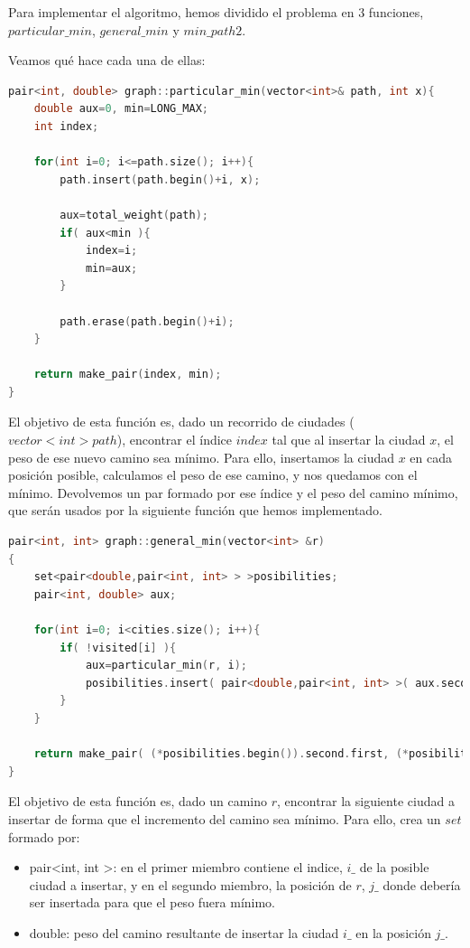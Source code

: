 \documentclass[11pt]{article}
\begin{document}
Para implementar el algoritmo, hemos dividido el problema en 3 funciones, $particular\_min$, $general\_min$ y $min\_path2$.

Veamos qué hace cada una de ellas:

\begin{lstlisting}[language=C++, caption=particular\_min]
pair<int, double> graph::particular_min(vector<int>& path, int x){
	double aux=0, min=LONG_MAX; 
	int index;
	
	for(int i=0; i<=path.size(); i++){
		path.insert(path.begin()+i, x);
		
		aux=total_weight(path);
		if( aux<min ){
			index=i;
			min=aux;
		}
		
		path.erase(path.begin()+i);
	}  

	return make_pair(index, min);
}
\end{lstlisting}

El objetivo de esta función es, dado un recorrido de ciudades ($vector<int> path$), encontrar el índice $index$ tal que al insertar la ciudad $x$, el peso de ese nuevo camino sea mínimo.
Para ello, insertamos la ciudad $x$ en cada posición posible, calculamos el peso de ese camino, y nos quedamos con el mínimo.
Devolvemos un par formado por ese índice y el peso del camino mínimo, que serán usados por la siguiente función que hemos implementado.

\begin{lstlisting}[language=C++, caption=general\_min]
pair<int, int> graph::general_min(vector<int> &r)
{
	set<pair<double,pair<int, int> > >posibilities;
	pair<int, double> aux;
	
	for(int i=0; i<cities.size(); i++){
		if( !visited[i] ){
			aux=particular_min(r, i);
			posibilities.insert( pair<double,pair<int, int> >( aux.second, make_pair(i, aux.first) ) );
		}
	}
	
	return make_pair( (*posibilities.begin()).second.first, (*posibilities.begin()).second.second );
}
\end{lstlisting}

El objetivo de esta función es, dado un camino $r$, encontrar la siguiente ciudad a insertar de forma que el incremento del camino sea mínimo. Para ello, crea un $set$ formado por:
\begin{itemize}
	\item pair\textless int, int \textgreater: en el primer miembro contiene el indice, $i\_$ de la posible ciudad a insertar, y en el segundo miembro, la posición de $r$, $j\_$ donde debería ser insertada para que el peso fuera mínimo.
	\item double: peso del camino resultante de insertar la ciudad $i\_$ en la posición $j\_$. 
\end{itemize}
\end{document}

